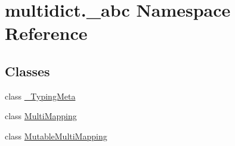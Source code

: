 \hypertarget{namespacemultidict_1_1__abc}{}\section{multidict.\+\_\+abc Namespace Reference}
\label{namespacemultidict_1_1__abc}
\subsection*{Classes}
\begin{DoxyCompactItemize}
\item 
class \hyperlink{classmultidict_1_1__abc_1_1___typing_meta}{\+\_\+\+Typing\+Meta}
\item 
class \hyperlink{classmultidict_1_1__abc_1_1_multi_mapping}{Multi\+Mapping}
\item 
class \hyperlink{classmultidict_1_1__abc_1_1_mutable_multi_mapping}{Mutable\+Multi\+Mapping}
\end{DoxyCompactItemize}
